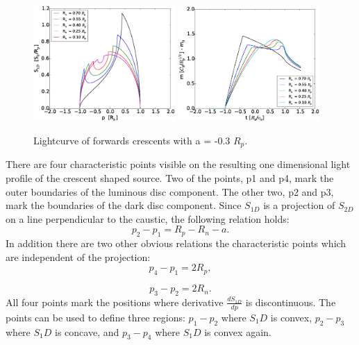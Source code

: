 \documentclass[usenatbib]{mn2e}
\begin{document}
\begin{figure}
\centering
	\includegraphics[width = 0.48\textwidth]{figures/S1D_var_rn_a_neg.eps}
	\includegraphics[width = 0.48\textwidth]{figures/5Rn_forw_var_magnification.eps}
\caption{\label{fig:lightcurve_crescent} Lightcurve of forwards crescents with a = -0.3 $R_p$.}
\end{figure}

There are four characteristic points visible on the resulting one dimensional light profile of the crescent shaped source. Two of the points, p1 and p4, mark the outer boundaries of the luminous disc component. The other two, p2 and p3, mark the boundaries of the dark disc component. Since $S_{1D}$ is a projection of $S_{2D}$ on a line perpendicular to the caustic, the following relation holds:
\begin{equation}
	p_2-p_1 = R_p -R_n - a.
\end{equation}
In addition there are two other obvious relations the characteristic points which are independent of the projection:
\begin{equation}
	p_4 -p_1 = 2 R_p,
\end{equation}

\begin{equation}
        p_3 -p_2 = 2 R_n.
\end{equation}
All four points mark the positions where derivative $\frac{dS_{1D}}{dp}$ is discontinuous. The points can be used to define three regions: $p_1 - p_2$ where $S_1D$ is convex, $p_2 - p_3$ where $S_1D$ is concave, and $p_3 - p_4$ where $S_1D$ is convex again. \\
\end{document}

